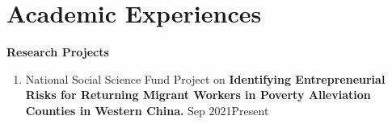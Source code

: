 \documentclass[a4paper,20pt]{article}
\begin{document}
\section{Academic Experiences}
\textbf{Research Projects}


    \begin{enumerate}
        \item National Social Science Fund Project on \textbf{Identifying Entrepreneurial Risks for Returning Migrant Workers in Poverty Alleviation Counties in Western China.} Sep 2021\textemdash Present


\end{enumerate}
\end{document}
